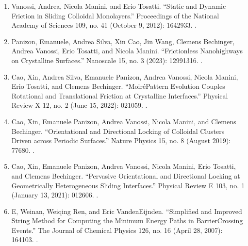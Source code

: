 \documentclass[letterpaper,10pt,english]{sphinxmanual}
\begin{document}
\label{\detokenize{index:references}}\begin{enumerate}
%
\item {} 
\sphinxAtStartPar
Vanossi, Andrea, Nicola Manini, and Erio Tosatti. “Static and Dynamic Friction in Sliding Colloidal Monolayers.” Proceedings of the National Academy of Sciences 109, no. 41 (October 9, 2012): 16429\textendash{}33. .

\item {} 
\sphinxAtStartPar
Panizon, Emanuele, Andrea Silva, Xin Cao, Jin Wang, Clemens Bechinger, Andrea Vanossi, Erio Tosatti, and Nicola Manini. “Frictionless Nanohighways on Crystalline Surfaces.” Nanoscale 15, no. 3 (2023): 1299\textendash{}1316. .

\item {} 
\sphinxAtStartPar
Cao, Xin, Andrea Silva, Emanuele Panizon, Andrea Vanossi, Nicola Manini, Erio Tosatti, and Clemens Bechinger. “Moiré\sphinxhyphen{}Pattern Evolution Couples Rotational and Translational Friction at Crystalline Interfaces.” Physical Review X 12, no. 2 (June 15, 2022): 021059. .

\item {} 
\sphinxAtStartPar
Cao, Xin, Emanuele Panizon, Andrea Vanossi, Nicola Manini, and Clemens Bechinger. “Orientational and Directional Locking of Colloidal Clusters Driven across Periodic Surfaces.” Nature Physics 15, no. 8 (August 2019): 776\textendash{}80. .

\item {} 
\sphinxAtStartPar
Cao, Xin, Emanuele Panizon, Andrea Vanossi, Nicola Manini, Erio Tosatti, and Clemens Bechinger. “Pervasive Orientational and Directional Locking at Geometrically Heterogeneous Sliding Interfaces.” Physical Review E 103, no. 1 (January 13, 2021): 012606. .

\item {} 
\sphinxAtStartPar
E, Weinan, Weiqing Ren, and Eric Vanden\sphinxhyphen{}Eijnden. “Simplified and Improved String Method for Computing the Minimum Energy Paths in Barrier\sphinxhyphen{}Crossing Events.” The Journal of Chemical Physics 126, no. 16 (April 28, 2007): 164103. .

\end{enumerate}
\end{document}
